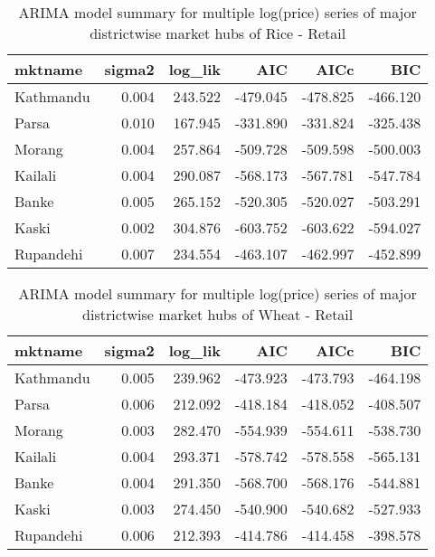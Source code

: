 \documentclass[
  12pt,
]{article}
\begin{document}
\begin{table}

\caption{\label{tab:multiple-arima-summary}ARIMA model summary for multiple log(price) series of major districtwise market hubs of Rice - Retail}
\centering
\begin{tabular}[t]{lrrrrr}
\toprule
mktname & sigma2 & log\_lik & AIC & AICc & BIC\\
\midrule
Kathmandu & 0.004 & 243.522 & -479.045 & -478.825 & -466.120\\
Parsa & 0.010 & 167.945 & -331.890 & -331.824 & -325.438\\
Morang & 0.004 & 257.864 & -509.728 & -509.598 & -500.003\\
Kailali & 0.004 & 290.087 & -568.173 & -567.781 & -547.784\\
Banke & 0.005 & 265.152 & -520.305 & -520.027 & -503.291\\
\addlinespace
Kaski & 0.002 & 304.876 & -603.752 & -603.622 & -594.027\\
Rupandehi & 0.007 & 234.554 & -463.107 & -462.997 & -452.899\\
\bottomrule
\end{tabular}
\end{table}
\begin{table}

\caption{\label{tab:multiple-arima-summary}ARIMA model summary for multiple log(price) series of major districtwise market hubs of Wheat - Retail}
\centering
\begin{tabular}[t]{lrrrrr}
\toprule
mktname & sigma2 & log\_lik & AIC & AICc & BIC\\
\midrule
Kathmandu & 0.005 & 239.962 & -473.923 & -473.793 & -464.198\\
Parsa & 0.006 & 212.092 & -418.184 & -418.052 & -408.507\\
Morang & 0.003 & 282.470 & -554.939 & -554.611 & -538.730\\
Kailali & 0.004 & 293.371 & -578.742 & -578.558 & -565.131\\
Banke & 0.004 & 291.350 & -568.700 & -568.176 & -544.881\\
\addlinespace
Kaski & 0.003 & 274.450 & -540.900 & -540.682 & -527.933\\
Rupandehi & 0.006 & 212.393 & -414.786 & -414.458 & -398.578\\
\bottomrule
\end{tabular}
\end{table}
\end{document}

